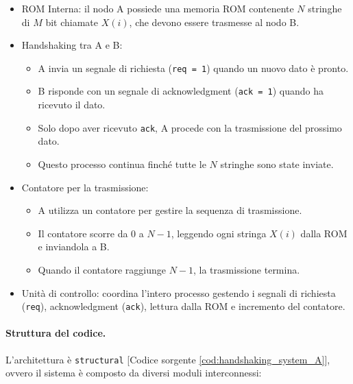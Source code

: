 \begin{itemize}
    \item ROM Interna: il nodo A possiede una memoria ROM contenente $N$ stringhe di $M$ bit chiamate $X(i)$, che devono essere trasmesse al nodo B.
    \item Handshaking tra A e B:
    \begin{itemize}
        \item A invia un segnale di richiesta (\texttt{req = 1}) quando un nuovo dato è pronto.
        \item B risponde con un segnale di acknowledgment (\texttt{ack = 1}) quando ha ricevuto il dato.
        \item Solo dopo aver ricevuto \texttt{ack}, A procede con la trasmissione del prossimo dato.
        \item Questo processo continua finché tutte le $N$ stringhe sono state inviate.
    \end{itemize}
    \item Contatore per la trasmissione:
    \begin{itemize}
        \item A utilizza un contatore per gestire la sequenza di trasmissione.
        \item Il contatore scorre da 0 a $N-1$, leggendo ogni stringa $X(i)$ dalla ROM e inviandola a B.
        \item Quando il contatore raggiunge $N-1$, la trasmissione termina.
    \end{itemize}
    \item Unità di controllo: coordina l'intero processo gestendo i segnali di richiesta (\texttt{req}), acknowledgment (\texttt{ack}), lettura dalla ROM e incremento del contatore.
\end{itemize}

\paragraph{Struttura del codice.}
L’architettura è \texttt{structural} [Codice sorgente \ref{cod:handshaking_system_A}], ovvero il sistema è composto da diversi moduli interconnessi:

